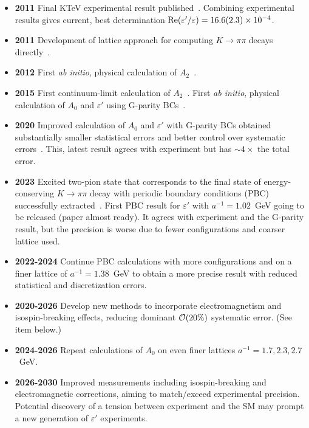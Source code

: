 \documentclass[12pt,hyperpdf]{article}
\begin{document}
\begin{itemize}
\begin{itemize}
    \item{\bf 2011} Final KTeV experimental result published~\cite{KTeV:2010sng}. Combining experimental results gives current, best determination ${\rm Re}(\varepsilon'/\varepsilon)=16.6(2.3)\times 10^{-4}$.
    \item{\bf 2011} Development of lattice approach for computing $K\to\pi\pi$ decays directly~\cite{Blum:2011pu}.
    \item{\bf 2012} First {\it ab initio}, physical calculation of $A_2$~\cite{Blum:2011ng,Blum:2012uk}.
    \item{\bf 2015} First continuum-limit calculation of $A_2$~\cite{Blum:2015ywa}. First {\it ab initio}, physical calculation of $A_0$ and $\varepsilon'$ using G-parity BCs~\cite{RBC:2015gro}.
    \item{\bf 2020} Improved calculation of $A_0$ and $\varepsilon'$ with G-parity BCs obtained substantially smaller statistical errors and better control over systematic errors~\cite{RBC:2020kdj}. This, latest result agrees with experiment but has ${\sim}4\times$ the total error.
    \item{\bf 2023} Excited two-pion state that corresponds to the final state of energy-conserving $K\to\pi\pi$ decay with periodic boundary conditions (PBC) successfully extracted~\cite{Blum:2023vhp}.  First PBC result for $\varepsilon'$ with $a^{-1}=1.02$~GeV going to be released (paper almost ready).  It agrees with experiment and the G-parity result, but the precision is worse due to fewer configurations and coarser lattice used.
    \item{\bf 2022-2024} Continue PBC calculations with more configurations and on a finer lattice of $a^{-1}=1.38$~GeV to obtain a more precise result with reduced statistical and discretization errors.
    \item{\bf 2020-2026} Develop new methods to incorporate electromagnetism and isospin-breaking effects, reducing dominant ${\cal O}(20\%)$ systematic error.  (See item below.)
    \item{\bf 2024-2026} Repeat calculations of $A_0$ on even finer lattices $a^{-1}=1.7, 2.3, 2.7$~GeV. 
    \item{\bf 2026-2030} Improved measurements including isospin-breaking and electromagnetic corrections, aiming to match/exceed experimental precision. Potential discovery of a tension between experiment and the SM may prompt a new generation of $\varepsilon'$ experiments. 
\end{itemize}
\end{itemize}
\end{document}
